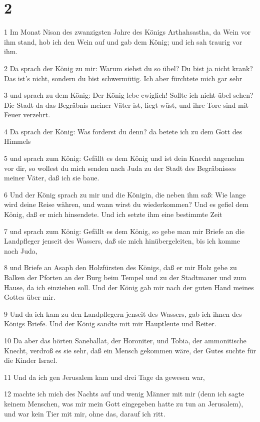 \chapter{2}

\par 1 Im Monat Nisan des zwanzigsten Jahre des Königs Arthahsastha, da Wein vor ihm stand, hob ich den Wein auf und gab dem König; und ich sah traurig vor ihm.
\par 2 Da sprach der König zu mir: Warum siehst du so übel? Du bist ja nicht krank? Das ist's nicht, sondern du bist schwermütig. Ich aber fürchtete mich gar sehr
\par 3 und sprach zu dem König: Der König lebe ewiglich! Sollte ich nicht übel sehen? Die Stadt da das Begräbnis meiner Väter ist, liegt wüst, und ihre Tore sind mit Feuer verzehrt.
\par 4 Da sprach der König: Was forderst du denn? da betete ich zu dem Gott des Himmels
\par 5 und sprach zum König: Gefällt es dem König und ist dein Knecht angenehm vor dir, so wollest du mich senden nach Juda zu der Stadt des Begräbnisses meiner Väter, daß ich sie baue.
\par 6 Und der König sprach zu mir und die Königin, die neben ihm saß: Wie lange wird deine Reise währen, und wann wirst du wiederkommen? Und es gefiel dem König, daß er mich hinsendete. Und ich setzte ihm eine bestimmte Zeit
\par 7 und sprach zum König: Gefällt es dem König, so gebe man mir Briefe an die Landpfleger jenseit des Wassers, daß sie mich hinübergeleiten, bis ich komme nach Juda,
\par 8 und Briefe an Asaph den Holzfürsten des Königs, daß er mir Holz gebe zu Balken der Pforten an der Burg beim Tempel und zu der Stadtmauer und zum Hause, da ich einziehen soll. Und der König gab mir nach der guten Hand meines Gottes über mir.
\par 9 Und da ich kam zu den Landpflegern jenseit des Wassers, gab ich ihnen des Königs Briefe. Und der König sandte mit mir Hauptleute und Reiter.
\par 10 Da aber das hörten Saneballat, der Horoniter, und Tobia, der ammonitische Knecht, verdroß es sie sehr, daß ein Mensch gekommen wäre, der Gutes suchte für die Kinder Israel.
\par 11 Und da ich gen Jerusalem kam und drei Tage da gewesen war,
\par 12 machte ich mich des Nachts auf und wenig Männer mit mir (denn ich sagte keinem Menschen, was mir mein Gott eingegeben hatte zu tun an Jerusalem), und war kein Tier mit mir, ohne das, darauf ich ritt.
